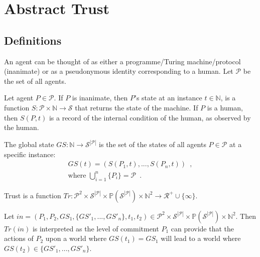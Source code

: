 \section{Abstract Trust}
  \subsection{Definitions}
    \begin{definition}[Agent]
       An agent can be thought of as either a programme/Turing machine/protocol (inanimate) or as a pseudonymous identity
       corresponding to a human. Let $\mathcal{P}$ be the set of all agents.
    \end{definition}
    \begin{definition}[State]
      Let agent $P \in \mathcal{P}$. If $P$ is inanimate, then $P$'s state at an instance $t \in \mathbb{N}$, is a function $S :
      \mathcal{P} \times \mathbb{N} \rightarrow \mathcal{S}$ that returns the state of the machine. If $P$ is a human, then
      $S\left(P, t\right)$ is a record of the internal condition of the human, as observed by the human.
    \end{definition}
    \begin{definition}
      The global state $GS : \mathbb{N} \rightarrow \mathcal{S}^{|\mathcal{P}|}$ is the set of the states of all agents $P \in
      \mathcal{P}$ at a specific instance: 
      \begin{gather*}
        GS\left(t\right) = \left(S\left(P_1, t\right), ...,S\left(P_n, t\right)\right) \enspace, \\
        \mbox{where } \bigcup\limits_{i = 1}^n\{P_i\} = \mathcal{P} \enspace.
      \end{gather*}
    \end{definition}
    \begin{definition}[Trust]
      Trust is a function $Tr : \mathcal{P}^2 \times \mathcal{S}^{|\mathcal{P}|} \times
      \mathbb{P}\left(\mathcal{S}^{|\mathcal{P}|}\right) \times \mathbb{N}^2 \rightarrow \mathcal{R}^{+} \cup \{\infty\}$.
    \end{definition}
    \noindent Let $in = \left(P_1, P_2, GS_1, \{GS'_1, ...,GS'_n\}, t_1, t_2\right) \in \mathcal{P}^2 \times
    \mathcal{S}^{|\mathcal{P}|} \times \mathbb{P}\left(\mathcal{S}^{|\mathcal{P}|}\right) \times \mathbb{N}^2$. Then
    $Tr\left(in\right)$ is interpreted as the level of commitment $P_1$ can provide that the actions of $P_2$ upon a world where
    $GS\left(t_1\right) = GS_1$ will lead to a world where $GS\left(t_2\right) \in \{GS'_1, ...,GS'_n\}$.

